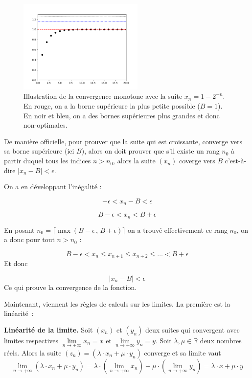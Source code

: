 \begin{figure}[H]
\centering \includegraphics[width = 0.55\textwidth]{./assets/imgs/monotone_convergence.png}
\caption{Illustration de la convergence monotone avec la suite $x_n = 1 - 2^{-n}$. En rouge, on a la borne supérieure la plus petite possible ($B = 1$). En noir et bleu, on a des bornes supérieures plus grandes et donc non-optimales.}
\label{fig:conv_monotone}
\end{figure}

De manière officielle, pour prouver que la suite qui est croissante, converge vers sa borne supérieure (ici $B$),  alors on doit prouver que s'il existe un rang $n_0$ à partir duquel tous les indices $n>n_0$, alors la suite $(x_n)$ coverge vers $B$ c'est-à-dire $\lvert x_n - B \rvert < \epsilon$.


On a en développant l'inégalité :

$$-\epsilon < x_n - B < \epsilon$$

$$ B - \epsilon < x_n < B + \epsilon$$

En posant $n_0 = \lceil \max{(B-\epsilon \, , \, B + \epsilon )} \rceil$ on a trouvé effectivement ce rang $n_0$, on a donc pour tout $n>n_0$ : 

$$B-\epsilon < x_n \leq x_{n+1} \leq x_{n+2} \leq \dots < B + \epsilon$$
Et donc 

$$\lvert x_n - B \rvert < \epsilon$$
Ce qui prouve la convergence de la fonction.




Maintenant, viennent les règles de calculs sur les limites. La première est la linéarité~:

\begin{greybox}
\textbf{Linéarité de la limite.} Soit $(x_n)$ et $(y_n)$ deux suites qui convergent avec limites respectives $\lim \limits_{n \to +\infty}x_n = x$ et $\lim \limits_{n \to +\infty}y_n = y$. Soit $\lambda, \mu \in \mathbb R$ deux nombres réels. Alors la suite $(z_n) = (\lambda \cdot x_n + \mu \cdot y_n)$ converge et sa limite vaut 
$$\lim \limits_{n \to +\infty}(\lambda \cdot x_n + \mu \cdot y_n) = \lambda \cdot \left(\lim \limits_{n \to +\infty}x_n\right) + \mu \cdot \left( \lim \limits_{n \to +\infty}y_n \right) = \lambda \cdot x + \mu \cdot y$$
\end{greybox}

